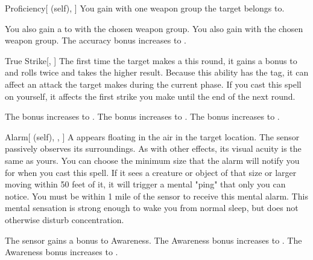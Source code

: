 \lowercase{\hypertarget{spell:Proficiency}{}}\label{spell:Proficiency}
\begin{attuneability}[Rank 1]{\hypertarget{spell:Proficiency}{Proficiency}}[ (self), ]
You gain  with one weapon group the target belongs to.

\rankline
{} You also gain a   to  with the chosen weapon group.
 You also gain  with the chosen weapon group.
 The accuracy bonus increases to .

\end{attuneability}
\vspace{0.25em}



\lowercase{\hypertarget{spell:True Strike}{}}\label{spell:True Strike}
\begin{freeability}[Rank 1]{\hypertarget{spell:True Strike}{True Strike}}[, ]
The first time the target makes a  this round,
it gains a  bonus to  and rolls twice and takes the higher result.
Because this ability has the  tag, it can affect an attack the target makes during the current phase.
If you cast this spell on yourself, it affects the first strike you make until the end of the next round.

\rankline
{} The bonus increases to .
 The bonus increases to .
 The bonus increases to .

\end{freeability}
\vspace{0.25em}



\lowercase{\hypertarget{spell:Alarm}{}}\label{spell:Alarm}
\begin{attuneability}[Rank 2]{\hypertarget{spell:Alarm}{Alarm}}[ (self), , ]
A  appears floating in the air in the target location.
The sensor passively observes its surroundings.
As with other  effects, its visual acuity is the same as yours.
You can choose the minimum size that the alarm will notify you for when you cast this spell.
If it sees a creature or object of that size or larger moving within 50 feet of it, it will trigger a mental "ping" that only you can notice.
You must be within 1 mile of the sensor to receive this mental alarm.
This mental sensation is strong enough to wake you from normal sleep, but does not otherwise disturb concentration.

\rankline
{} The sensor gains a  bonus to Awareness.
 The Awareness bonus increases to .
 The Awareness bonus increases to .

\end{attuneability}
\vspace{0.25em}



